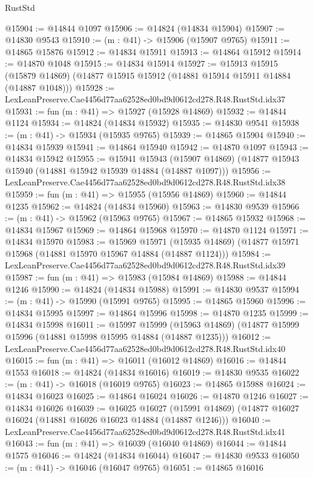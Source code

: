 \begin{lexlean}{RustStd}
\begin{coremodule}
@15904 := @14844 @1097
@15906 := @14824 (@14834 @15904)
@15907 := @14830 @9543
@15910 := (m : @41) -> @15906 (@15907 @9765)
@15911 := @14865 @15876
@15912 := @14834 @15911
@15913 := @14864 @15912
@15914 := @14870 @1048
@15915 := @14834 @15914
@15927 := @15913
    @15915
    (@15879 @14869)
    (@14877 @15915 @15912 (@14881 @15914 @15911 @14884 (@14887 @1048)))
@15928 := LexLeanPreserve.Cae4456d77aa62528ed0bd9d0612cd278.R48.RustStd.idx37
@15931 := fun (m : @41) => @15927 (@15928 @14869)
@15932 := @14844 @1124
@15934 := @14824 (@14834 @15932)
@15935 := @14830 @9541
@15938 := (m : @41) -> @15934 (@15935 @9765)
@15939 := @14865 @15904
@15940 := @14834 @15939
@15941 := @14864 @15940
@15942 := @14870 @1097
@15943 := @14834 @15942
@15955 := @15941
    @15943
    (@15907 @14869)
    (@14877 @15943 @15940 (@14881 @15942 @15939 @14884 (@14887 @1097)))
@15956 := LexLeanPreserve.Cae4456d77aa62528ed0bd9d0612cd278.R48.RustStd.idx38
@15959 := fun (m : @41) => @15955 (@15956 @14869)
@15960 := @14844 @1235
@15962 := @14824 (@14834 @15960)
@15963 := @14830 @9539
@15966 := (m : @41) -> @15962 (@15963 @9765)
@15967 := @14865 @15932
@15968 := @14834 @15967
@15969 := @14864 @15968
@15970 := @14870 @1124
@15971 := @14834 @15970
@15983 := @15969
    @15971
    (@15935 @14869)
    (@14877 @15971 @15968 (@14881 @15970 @15967 @14884 (@14887 @1124)))
@15984 := LexLeanPreserve.Cae4456d77aa62528ed0bd9d0612cd278.R48.RustStd.idx39
@15987 := fun (m : @41) => @15983 (@15984 @14869)
@15988 := @14844 @1246
@15990 := @14824 (@14834 @15988)
@15991 := @14830 @9537
@15994 := (m : @41) -> @15990 (@15991 @9765)
@15995 := @14865 @15960
@15996 := @14834 @15995
@15997 := @14864 @15996
@15998 := @14870 @1235
@15999 := @14834 @15998
@16011 := @15997
    @15999
    (@15963 @14869)
    (@14877 @15999 @15996 (@14881 @15998 @15995 @14884 (@14887 @1235)))
@16012 := LexLeanPreserve.Cae4456d77aa62528ed0bd9d0612cd278.R48.RustStd.idx40
@16015 := fun (m : @41) => @16011 (@16012 @14869)
@16016 := @14844 @1553
@16018 := @14824 (@14834 @16016)
@16019 := @14830 @9535
@16022 := (m : @41) -> @16018 (@16019 @9765)
@16023 := @14865 @15988
@16024 := @14834 @16023
@16025 := @14864 @16024
@16026 := @14870 @1246
@16027 := @14834 @16026
@16039 := @16025
    @16027
    (@15991 @14869)
    (@14877 @16027 @16024 (@14881 @16026 @16023 @14884 (@14887 @1246)))
@16040 := LexLeanPreserve.Cae4456d77aa62528ed0bd9d0612cd278.R48.RustStd.idx41
@16043 := fun (m : @41) => @16039 (@16040 @14869)
@16044 := @14844 @1575
@16046 := @14824 (@14834 @16044)
@16047 := @14830 @9533
@16050 := (m : @41) -> @16046 (@16047 @9765)
@16051 := @14865 @16016

\end{coremodule}
\end{lexlean}
